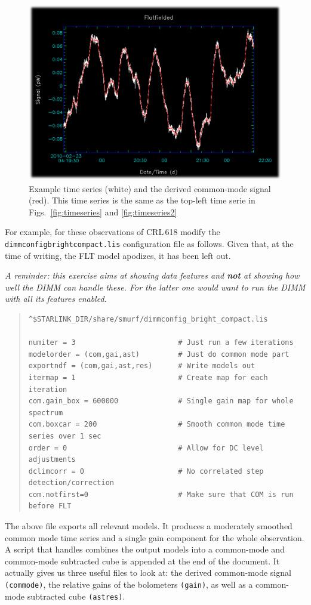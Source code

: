 \documentclass[twoside,11pt]{article}
\renewcommand{\_}{\texttt{\symbol{95}}}
\newenvironment{myquote}{\begin{quote}\begin{small}}{\end{small}\end{quote}}
\begin{document}
\begin{figure}
\begin{center}
\includegraphics[width=0.45\linewidth]{sc19_dimm_common_mode}
\caption{Example time series (white) and the derived
common-mode signal (red).  This time series is the same as the
top-left time serie in Figs.~\ref{fig:timeseries} and \ref{fig:timeseries2}}
\label{fig:dimmcommonmode}
\end{center}
\end{figure}

For example, for these observations of CRL\,618 modify the
\texttt{dimmconfig\_bright\_compact.lis} configuration file as
follows. Given that, at the time of writing, the FLT model apodizes,
it has been left out.

\emph{A reminder: this exercise aims at showing data features and
\textbf{not} at showing how well the DIMM can handle these. For the
latter one would want to run the DIMM with all its features
enabled.}

\begin{myquote}
\begin{verbatim}
^$STARLINK_DIR/share/smurf/dimmconfig_bright_compact.lis

numiter = 3                        # Just run a few iterations
modelorder = (com,gai,ast)         # Just do common mode part
exportndf = (com,gai,ast,res)      # Write models out
itermap = 1                        # Create map for each iteration
com.gain_box = 600000              # Single gain map for whole spectrum
com.boxcar = 200                   # Smooth common mode time series over 1 sec
order = 0                          # Allow for DC level adjustments
dclimcorr = 0                      # No correlated step detection/correction
com.notfirst=0                     # Make sure that COM is run before FLT
\end{verbatim}
\end{myquote}

The above file exports all relevant models. It produces a moderately
smoothed common mode time series and a single gain component for the
whole observation. A script that handles combines the output models
into a common-mode and common-mode subtracted cube is appended at the
end of the document. It actually gives us three useful files to look
at: the derived common-mode signal \texttt{(\_commode)}, the relative
gains of the bolometers \texttt{(\_gain)}, as well as a common-mode
subtracted cube \texttt{(\_astres)}.
\end{document}

